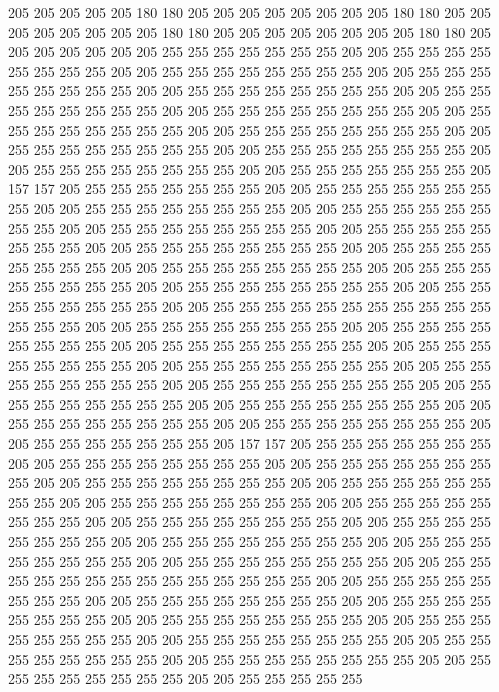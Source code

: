 205 205 205 205 205 180 180 205 205 205 205 205 205 205 205 180 180 205 205 205
205 205 205 205 205 180 180 205 205 205 205 205 205 205 205 180 180 205 205 205
205 205 205 205 255 255 255 255 255 255 255 205 205 255 255 255 255 255 255 255
255 205 205 255 255 255 255 255 255 255 255 205 205 255 255 255 255 255 255 255
255 205 205 255 255 255 255 255 255 255 255 205 205 255 255 255 255 255 255 255
255 205 205 255 255 255 255 255 255 255 255 205 205 255 255 255 255 255 255 255
255 205 205 255 255 255 255 255 255 255 255 205 205 255 255 255 255 255 255 255
255 205 205 255 255 255 255 255 255 255 255 205 205 255 255 255 255 255 255 255
255 205 205 255 255 255 255 255 255 255 205 157 157 205 255 255 255 255 255 255
255 205 205 255 255 255 255 255 255 255 255 205 205 255 255 255 255 255 255 255
255 205 205 255 255 255 255 255 255 255 255 205 205 255 255 255 255 255 255 255
255 205 205 255 255 255 255 255 255 255 255 205 205 255 255 255 255 255 255 255
255 205 205 255 255 255 255 255 255 255 255 205 205 255 255 255 255 255 255 255
255 205 205 255 255 255 255 255 255 255 255 205 205 255 255 255 255 255 255 255
255 205 205 255 255 255 255 255 255 255 255 205 205 255 255 255 255 255 255 255
255 255 255 255 255 255 255 205 205 255 255 255 255 255 255 255 255 205 205 255
255 255 255 255 255 255 255 205 205 255 255 255 255 255 255 255 255 205 205 255
255 255 255 255 255 255 255 205 205 255 255 255 255 255 255 255 255 205 205 255
255 255 255 255 255 255 255 205 205 255 255 255 255 255 255 255 255 205 205 255
255 255 255 255 255 255 255 205 205 255 255 255 255 255 255 255 255 205 205 255
255 255 255 255 255 255 255 205 205 255 255 255 255 255 255 255 255 205 205 255
255 255 255 255 255 255 205 157 157 205 255 255 255 255 255 255 255 205 205 255
255 255 255 255 255 255 255 205 205 255 255 255 255 255 255 255 255 205 205 255
255 255 255 255 255 255 255 205 205 255 255 255 255 255 255 255 255 205 205 255
255 255 255 255 255 255 255 205 205 255 255 255 255 255 255 255 255 205 205 255
255 255 255 255 255 255 255 205 205 255 255 255 255 255 255 255 255 205 205 255
255 255 255 255 255 255 255 205 205 255 255 255 255 255 255 255 255 205 205 255
255 255 255 255 255 255 255 205 205 255 255 255 255 255 255 255 255 255 255 255
255 255 255 205 205 255 255 255 255 255 255 255 255 205 205 255 255 255 255 255
255 255 255 205 205 255 255 255 255 255 255 255 255 205 205 255 255 255 255 255
255 255 255 205 205 255 255 255 255 255 255 255 255 205 205 255 255 255 255 255
255 255 255 205 205 255 255 255 255 255 255 255 255 205 205 255 255 255 255 255
255 255 255 205 205 255 255 255 255 255 255 255 255 205 205 255 255 255 255 255
